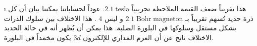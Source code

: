 \begin {corrige}[\thechapter ]{\i }
 هذا   تقريباً ضعف القيمة الملاحظة تجريبياً 
$2.1\; \mathrm{tesla}$.
 عوداً لحساباتنا يمكننا بيان أن كل ذرة حديد تُسهم تقريباً بـ 
$2.1\; \mathrm{Bohr\;magneton}$
و ليس 
$4$
. هذا الاختلاف بين سلوك الذرات بشكل مستقل وسلوكها في البلورة الصلبة.
هذا يمكن أن يُظهر أنه في حالة الحديد الاختلاف ناتج عن أن
العزم المداري 
 للإلكترون
$3d$
 يكون مخمداً في البلورة.
 \end {corrige}\par \vspace *{\spacebeforeexo }

